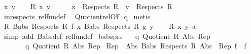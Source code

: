 \begin{isabellebody}
\ x\ y\isanewline
\ \ \isamarkupfalse%
\ {\isachardoublequoteopen}R{}\ x\ y{\isachardoublequoteclose}\isanewline
\ \ \isamarkupfalse%
\ \isamarkupfalse%
\ {\isachardoublequoteopen}x\ {\isasymin}\ Respects\ R{}\ {\isasymand}\ y\ {\isasymin}\ Respects\ R{}{\isachardoublequoteclose}\isanewline
\ \ \ \ \isamarkupfalse%
\ in{\isacharunderscore}{\kern0pt}respects\ rel{\isacharunderscore}{\kern0pt}fun{\isacharunderscore}{\kern0pt}def\ \isamarkupfalse%
\ Quotient{}{\isacharunderscore}{\kern0pt}rel{\isacharbrackleft}{\kern0pt}OF\ q{\isacharbrackright}{\kern0pt}\isamarkupfalse%
\ metis\isanewline
\ \ \isamarkupfalse%
\ \isamarkupfalse%
\ {\isachardoublequoteopen}R{}\ {\isacharparenleft}{\kern0pt}Babs\ {\isacharparenleft}{\kern0pt}Respects\ R{}{\isacharparenright}{\kern0pt}\ f\ x{\isacharparenright}{\kern0pt}\ {\isacharparenleft}{\kern0pt}Babs\ {\isacharparenleft}{\kern0pt}Respects\ R{}{\isacharparenright}{\kern0pt}\ g\ y{\isacharparenright}{\kern0pt}{\isachardoublequoteclose}\isanewline
\ \ \isamarkupfalse%
\ {\isacartoucheopen}R{}\ x\ y{\isacartoucheclose}\ a\ \isamarkupfalse%
\ {\isacharparenleft}{\kern0pt}simp\ add{\isacharcolon}{\kern0pt}\ Babs{\isacharunderscore}{\kern0pt}def\ rel{\isacharunderscore}{\kern0pt}fun{\isacharunderscore}{\kern0pt}def{\isacharparenright}{\kern0pt}\isanewline
{}\isamarkupfalse%
%
\endisatagproof
{\isafoldproof}%
%
\isadelimproof
\isanewline
%
\endisadelimproof
\isanewline
{}\isamarkupfalse%
\ babs{\isacharunderscore}{\kern0pt}prs{\isacharcolon}{\kern0pt}\isanewline
\ \ \ q{}{\isacharcolon}{\kern0pt}\ {\isachardoublequoteopen}Quotient{}\ R{}\ Abs{}\ Rep{}{\isachardoublequoteclose}\isanewline
\ \ \ \ \ \ \ q{}{\isacharcolon}{\kern0pt}\ {\isachardoublequoteopen}Quotient{}\ R{}\ Abs{}\ Rep{}{\isachardoublequoteclose}\isanewline
{}\ {\isachardoublequoteopen}{\isacharparenleft}{\kern0pt}{\isacharparenleft}{\kern0pt}Rep{}\ {\isacharminus}{\kern0pt}{\isacharminus}{\kern0pt}{\isacharminus}{\kern0pt}{\isachargreater}{\kern0pt}\ Abs{}{\isacharparenright}{\kern0pt}\ {\isacharparenleft}{\kern0pt}Babs\ {\isacharparenleft}{\kern0pt}Respects\ R{}{\isacharparenright}{\kern0pt}\ {\isacharparenleft}{\kern0pt}{\isacharparenleft}{\kern0pt}Abs{}\ {\isacharminus}{\kern0pt}{\isacharminus}{\kern0pt}{\isacharminus}{\kern0pt}{\isachargreater}{\kern0pt}\ Rep{}{\isacharparenright}{\kern0pt}\ f{\isacharparenright}{\kern0pt}{\isacharparenright}{\kern0pt}{\isacharparenright}{\kern0pt}\ {\isacharequal}{\kern0pt}\ f{\isachardoublequoteclose}\isanewline

\end{isabellebody}
